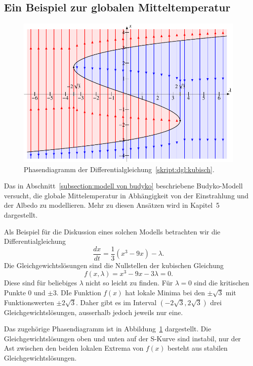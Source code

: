 \subsection{Ein Beispiel zur globalen Mitteltemperatur\label{subsection:budyko}}
%
\begin{figure}
\includegraphics{chapters/3/kubisch.pdf}
\caption{Phasendiagramm der Differentialgleichung~\eqref{skript:dgl:kubisch}.
\label{skript:dgl:kubischfig}}
\end{figure}
Das in Abschnitt~\ref{subsection:modell von budyko} beschriebene
Budyko-Modell versucht, die globale Mittelemperatur in Abhängigkeit
von der Einstrahlung und der Albedo zu modellieren.
Mehr zu diesen Ansätzen wird in Kapitel~5 dargestellt.

Als Beispiel für die Diskussion eines solchen Modells betrachten wir
die Differentialgleichung
\begin{equation}
\frac{dx}{dt}
=
\frac13(x^3 - 9x) - \lambda.
\label{skript:dgl:kubisch}
\end{equation}
Die Gleichgewichtslösungen sind die Nullstellen der kubischen Gleichung
\[
f(x,\lambda)
=
x^3-9x-3\lambda=0.
\]
Diese sind für beliebiges $\lambda$ nicht so leicht zu finden.
Für $\lambda=0$ sind die kritischen Punkte $0$ und $\pm 3$.
DIe Funktion $f(x)$ hat lokale Minima bei den $\pm\sqrt{3}$ mit
Funktionswerten $\pm2\sqrt{3}$.
Daher gibt es im Interval $(-2\sqrt{3},2\sqrt{3})$ drei 
Gleichgewichtslösungen, ausserhalb jedoch jeweils nur eine.

Das zugehörige Phasendiagramm ist in Abbildung~\ref{skript:dgl:kubischfig}
dargestellt.
Die Gleichgewichtslösungen oben und unten auf der S-Kurve sind instabil,
nur der Ast zwischen den beiden lokalen Extrema von $f(x)$ besteht
aus stabilen Gleichgewichtslösungen.

